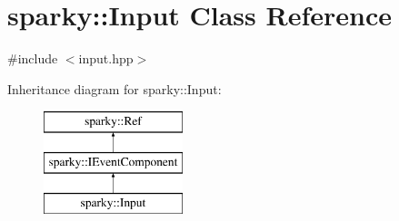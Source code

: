 \hypertarget{classsparky_1_1_input}{}\section{sparky\+:\+:Input Class Reference}
\label{classsparky_1_1_input}


{\ttfamily \#include $<$input.\+hpp$>$}

Inheritance diagram for sparky\+:\+:Input\+:\begin{figure}[H]
\begin{center}
\leavevmode
\includegraphics[height=3.000000cm]{classsparky_1_1_input}
\end{center}
\end{figure}
